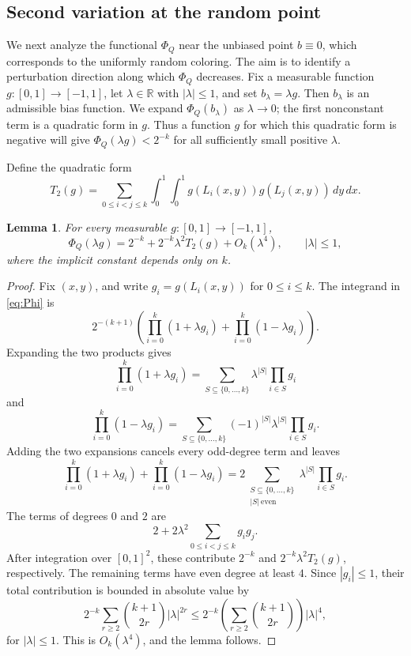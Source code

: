 \documentclass[twoside,12pt]{article}
\newcommand{\R}{\mathbb{R}}
\newcommand{\1}{\mathbf 1}
\newtheorem{lemma}{Lemma}[section]
\begin{document}
\subsection{Second variation at the random point}

We next analyze the functional \(\Phi_Q\) near the unbiased point
\(b\equiv0\), which corresponds to the uniformly random coloring.  The aim is
to identify a perturbation direction along which \(\Phi_Q\) decreases.  Fix a
measurable function \(g:[0,1]\to[-1,1]\), let \(\lambda\in\R\) with
\(|\lambda|\le1\), and set \(b_\lambda=\lambda g\).  Then \(b_\lambda\) is an
admissible bias function.  We expand \(\Phi_Q(b_\lambda)\) as
\(\lambda\to0\); the first nonconstant term is a quadratic form in \(g\).
Thus a function \(g\) for which this quadratic form is negative will give
\(\Phi_Q(\lambda g)<2^{-k}\) for all sufficiently small positive \(\lambda\).

Define the quadratic form
\begin{equation}\label{eq:T2}
T_2(g)=
\sum_{0\le i<j\le k}
\int_0^1\!\int_0^1 g(L_i(x,y))g(L_j(x,y))\,dy\,dx.
\end{equation}

\begin{lemma}\label{lem:even-expansion}
For every measurable \(g:[0,1]\to[-1,1]\),
\begin{equation}\label{eq:Phi-expansion}
\Phi_Q(\lambda g)=2^{-k}+2^{-k}\lambda^2T_2(g)+O_k(\lambda^4),
\qquad |\lambda|\le 1,
\end{equation}
where the implicit constant depends only on \(k\).
\end{lemma}


\begin{proof}
Fix \((x,y)\), and write \(g_i=g(L_i(x,y))\) for \(0\le i\le k\).  The
integrand in \eqref{eq:Phi} is
\[
2^{-(k+1)}
\left(
\prod_{i=0}^k(1+\lambda g_i)
+
\prod_{i=0}^k(1-\lambda g_i)
\right).
\]
Expanding the two products gives
\[
\prod_{i=0}^k(1+\lambda g_i)
=
\sum_{S\subseteq\{0,\dots,k\}}
\lambda^{|S|}\prod_{i\in S}g_i
\]
and
\[
\prod_{i=0}^k(1-\lambda g_i)
=
\sum_{S\subseteq\{0,\dots,k\}}
(-1)^{|S|}\lambda^{|S|}\prod_{i\in S}g_i.
\]
Adding the two expansions cancels every odd-degree term and leaves
\[
\prod_{i=0}^k(1+\lambda g_i)
+
\prod_{i=0}^k(1-\lambda g_i)
=
2\sum_{\substack{S\subseteq\{0,\dots,k\}\\ |S|\ \mathrm{even}}}
\lambda^{|S|}\prod_{i\in S}g_i.
\]
The terms of degrees \(0\) and \(2\) are
\[
2+2\lambda^2\sum_{0\le i<j\le k}g_i g_j.
\]
After integration over \([0,1]^2\), these contribute \(2^{-k}\) and
\(2^{-k}\lambda^2T_2(g)\), respectively.  The remaining terms have even degree
at least \(4\).  Since \(|g_i|\le1\), their total contribution is bounded in
absolute value by
\[
2^{-k}
\sum_{r\ge2}\binom{k+1}{2r}|\lambda|^{2r}
\le
2^{-k}\left(\sum_{r\ge2}\binom{k+1}{2r}\right)|\lambda|^4,
\]
for \(|\lambda|\le1\).  This is \(O_k(\lambda^4)\), and the lemma follows.
\end{proof}
\end{document}
